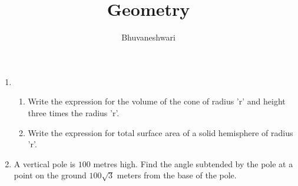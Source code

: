 \documentclass{article}
\title{Geometry}
\author{Bhuvaneshwari }
\begin{document}
\maketitle
\begin{enumerate}
\item 
\begin{enumerate}
    \item Write the expression for the volume of the cone of radius 'r' and height three times the radius 'r'.
    \item Write the expression for total surface area of a solid hemisphere of radius 'r'.
\end{enumerate}
\item A vertical pole is $100$ metres high. Find the angle subtended by the pole at a point on
the ground $100 \sqrt{3}$ meters from the base of the pole.


\end{enumerate}
\end{document}
